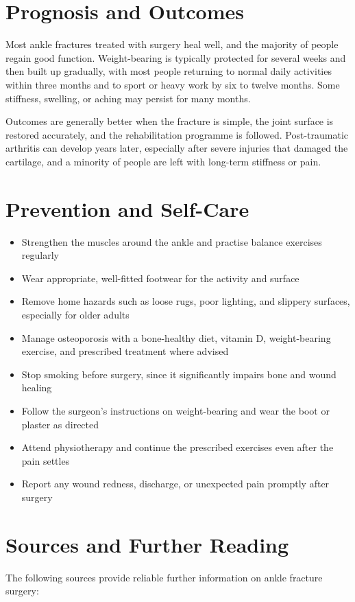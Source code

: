\section*{Prognosis and Outcomes}
Most ankle fractures treated with surgery heal well, and the majority of people regain good function. Weight-bearing is typically protected for several weeks and then built up gradually, with most people returning to normal daily activities within three months and to sport or heavy work by six to twelve months. Some stiffness, swelling, or aching may persist for many months.

Outcomes are generally better when the fracture is simple, the joint surface is restored accurately, and the rehabilitation programme is followed. Post-traumatic arthritis can develop years later, especially after severe injuries that damaged the cartilage, and a minority of people are left with long-term stiffness or pain.

\section*{Prevention and Self-Care}
\begin{itemize}
    \item Strengthen the muscles around the ankle and practise balance exercises regularly
    \item Wear appropriate, well-fitted footwear for the activity and surface
    \item Remove home hazards such as loose rugs, poor lighting, and slippery surfaces, especially for older adults
    \item Manage osteoporosis with a bone-healthy diet, vitamin D, weight-bearing exercise, and prescribed treatment where advised
    \item Stop smoking before surgery, since it significantly impairs bone and wound healing
    \item Follow the surgeon's instructions on weight-bearing and wear the boot or plaster as directed
    \item Attend physiotherapy and continue the prescribed exercises even after the pain settles
    \item Report any wound redness, discharge, or unexpected pain promptly after surgery
\end{itemize}

\section*{Sources and Further Reading}
The following sources provide reliable further information on ankle fracture surgery:

